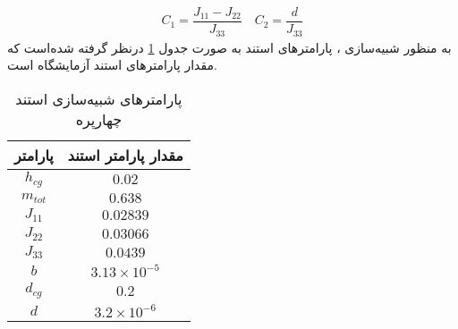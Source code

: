 \begin{align*}
	C_1 =\dfrac{J_{11}-J_{22}}{J_{33}}\quad
	C_2 =\dfrac{d}{J_{33}}
\end{align*}
به منظور شبیه‌سازی ، پارامترهای استند به صورت جدول 
\ref{parameterstable}
درنظر گرفته شده‌است که 
مقدار پارامترهای استند آزمایشگاه است.
\begin{table}[H]
	\caption {پارامترهای شبیه‌سازی استند چهارپره\cite{norian}} 
	\label{parameterstable}
	\begin{center}
		\begin{tabular}{ |c|c| }
			\hline
	پارامتر & مقدار پارامتر استند \\
			\hline
			$h_{cg}$ & $0.02$\\
			\hline
			$m_{tot}$ & $0.638$\\
			\hline
			$J_{11}$ & $0.02839$\\
			\hline
			$J_{22}$ & $0.03066$\\
			\hline
			$J_{33}$ & $0.0439$\\
			\hline
			$b$ & $3.13\times10^{-5}$\\
			\hline
			$d_{cg}$ & $0.2$\\
			\hline
			$d$ & $3.2\times10^{-6}$\\
			\hline
		\end{tabular}
	\end{center}
\end{table}


